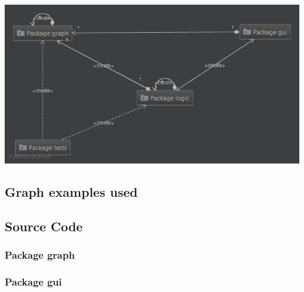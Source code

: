 \documentclass[a4paper]{article}
\begin{document}
\begin{center}
\includegraphics[scale=0.5]{../../diagrams/module_diagram.png}
\end{center}

\subsection{Graph examples used}\label{graphs}

\begin{center}\label{small_graph}
	
\end{center}

\begin{center}\label{medium_graph}
	
\end{center}

\begin{center}\label{big_graph}
	
\end{center}


\subsection{Source Code}\label{source}
\subsubsection{Package graph}



\subsubsection{Package gui}


\end{document}
